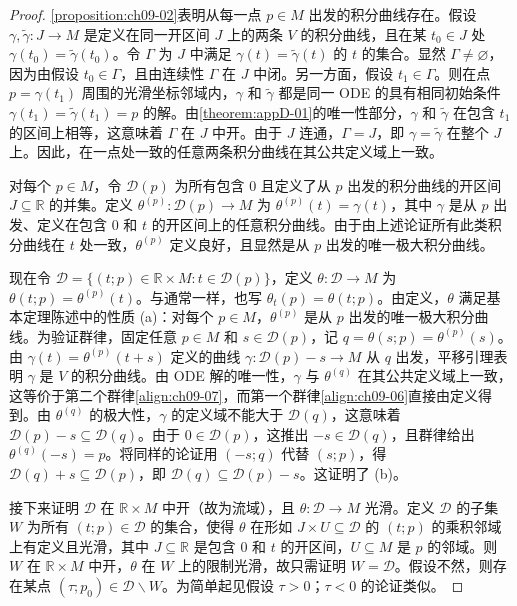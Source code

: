 \documentclass[../../main.tex]{subfiles}
\begin{document}
\begin{proof}
\cref{proposition:ch09-02}表明从每一点 $p\in M$ 出发的积分曲线存在。假设 $\gamma,\widetilde{\gamma}\colon J\to M$ 是定义在同一开区间 $J$ 上的两条 $V$ 的积分曲线，且在某 $t_0\in J$ 处 $\gamma(t_0)=\widetilde{\gamma}(t_0)$。令 $\Gamma$ 为 $J$ 中满足 $\gamma(t)=\widetilde{\gamma}(t)$ 的 $t$ 的集合。显然 $\Gamma\neq\varnothing $，因为由假设 $t_0\in\Gamma$，且由连续性 $\Gamma$ 在 $J$ 中闭。另一方面，假设 $t_1\in\Gamma$。则在点 $p=\gamma(t_1)$ 周围的光滑坐标邻域内，$\gamma$ 和 $\widetilde{\gamma}$ 都是同一 ODE 的具有相同初始条件 $\gamma(t_1)=\widetilde{\gamma}(t_1)=p$ 的解。由\cref{theorem:appD-01}的唯一性部分，$\gamma$ 和 $\widetilde{\gamma}$ 在包含 $t_1$ 的区间上相等，这意味着 $\Gamma$ 在 $J$ 中开。由于 $J$ 连通，$\Gamma=J$，即 $\gamma=\widetilde{\gamma}$ 在整个 $J$ 上。因此，在一点处一致的任意两条积分曲线在其公共定义域上一致。

对每个 $p\in M$，令 $\mathscr{D}(p)$ 为所有包含 $0$ 且定义了从 $p$ 出发的积分曲线的开区间 $J\subseteq\mathbb{R}$ 的并集。定义 $\theta^{(p)}\colon\mathscr{D}(p)\to M$ 为 $\theta^{(p)}(t)=\gamma(t)$，其中 $\gamma$ 是从 $p$ 出发、定义在包含 $0$ 和 $t$ 的开区间上的任意积分曲线。由于由上述论证所有此类积分曲线在 $t$ 处一致，$\theta^{(p)}$ 定义良好，且显然是从 $p$ 出发的唯一极大积分曲线。

现在令 $\mathscr{D}=\{(t;p)\in\mathbb{R}\times M:t\in\mathscr{D}(p)\}$，定义 $\theta\colon\mathscr{D}\to M$ 为 $\theta(t;p)=\theta^{(p)}(t)$。与通常一样，也写 $\theta_t(p)=\theta(t;p)$。由定义，$\theta$ 满足基本定理陈述中的性质 (a)：对每个 $p\in M$，$\theta^{(p)}$ 是从 $p$ 出发的唯一极大积分曲线。为验证群律，固定任意 $p\in M$ 和 $s\in\mathscr{D}(p)$，记 $q=\theta(s;p)=\theta^{(p)}(s)$。由 $\gamma(t)=\theta^{(p)}(t+s)$ 定义的曲线 $\gamma\colon\mathscr{D}(p)-s\to M$ 从 $q$ 出发，平移引理表明 $\gamma$ 是 $V$ 的积分曲线。由 ODE 解的唯一性，$\gamma$ 与 $\theta^{(q)}$ 在其公共定义域上一致，这等价于第二个群律\eqref{align:ch09-07}，而第一个群律\eqref{align:ch09-06}直接由定义得到。由 $\theta^{(q)}$ 的极大性，$\gamma$ 的定义域不能大于 $\mathscr{D}(q)$，这意味着 $\mathscr{D}(p)-s\subseteq\mathscr{D}(q)$。由于 $0\in\mathscr{D}(p)$，这推出 $-s\in\mathscr{D}(q)$，且群律给出 $\theta^{(q)}(-s)=p$。将同样的论证用 $(-s;q)$ 代替 $(s;p)$，得 $\mathscr{D}(q)+s\subseteq\mathscr{D}(p)$，即 $\mathscr{D}(q)\subseteq\mathscr{D}(p)-s$。这证明了 (b)。

接下来证明 $\mathscr{D}$ 在 $\mathbb{R}\times M$ 中开（故为流域），且 $\theta\colon\mathscr{D}\to M$ 光滑。定义 $\mathscr{D}$ 的子集 $W$ 为所有 $(t;p)\in\mathscr{D}$ 的集合，使得 $\theta$ 在形如 $J\times U\subseteq\mathscr{D}$ 的 $(t;p)$ 的乘积邻域上有定义且光滑，其中 $J\subseteq\mathbb{R}$ 是包含 $0$ 和 $t$ 的开区间，$U\subseteq M$ 是 $p$ 的邻域。则 $W$ 在 $\mathbb{R}\times M$ 中开，$\theta$ 在 $W$ 上的限制光滑，故只需证明 $W=\mathscr{D}$。假设不然，则存在某点 $(\tau;p_0)\in\mathscr{D}\smallsetminus W$。为简单起见假设 $\tau>0$；$\tau<0$ 的论证类似。


\end{proof}
\end{document}
